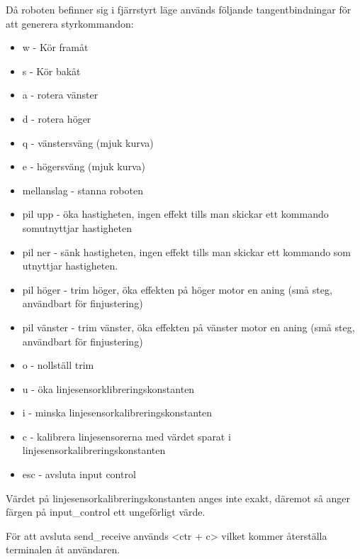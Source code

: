 Då roboten befinner sig i fjärrstyrt läge används följande tangentbindningar för
att generera styrkommandon: 
\begin{itemize}
\item w - Kör framåt
\item s - Kör bakåt
\item a - rotera vänster
\item d - rotera höger
\item q - vänstersväng (mjuk kurva)
\item e - högersväng (mjuk kurva)
\item mellanslag - stanna roboten
\item pil upp - öka hastigheten, ingen effekt tills man skickar ett kommando somutnyttjar hastigheten
\item pil ner - sänk hastigheten, ingen effekt tills man skickar ett kommando som utnyttjar hastigheten.
\item pil höger - trim höger, öka effekten på höger motor en aning (små steg, användbart för finjustering)
\item pil vänster - trim vänster, öka effekten på vänster motor en aning (små steg, användbart för finjustering)
\item o - nollställ trim
\item u - öka linjesensorklibreringskonstanten 
\item i - minska linjesensorkalibreringskonstanten
\item c - kalibrera linjesensorerna med värdet sparat i
linjesensorkalibreringskonstanten
\item esc - avsluta input control
\end{itemize}

Värdet på linjesensorkalibreringskonstanten anges inte exakt, däremot så anger
färgen på input\_control ett ungeförligt värde.

För att avsluta send\_receive används <ctr + c> vilket kommer återställa
terminalen åt användaren.
